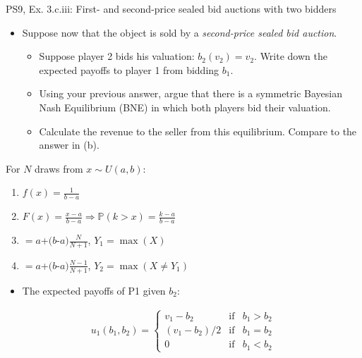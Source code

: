 \begin{frame}{PS9, Ex. 3.c.iii: First- and second-price sealed bid auctions with two bidders}
    \begin{multicols}{2}
      \begin{itemize}
        \item[(c)] Suppose now that the object is sold by a \textit{second-price sealed bid auction}.
        \begin{itemize}\normalsize
          \item[i.]   Suppose player 2 bids his valuation: $b_2(v_2) = v_2$. Write down the expected payoffs to player 1 from bidding $b_1$.
          \item[ii.]  Using your previous answer, argue that there is a symmetric Bayesian Nash Equilibrium (BNE) in which both players bid their valuation.
          \item[iii.] Calculate the revenue to the seller from this equilibrium. Compare to the answer in (b).
        \end{itemize}
      \end{itemize}
      For $N$ draws from $x\sim U(a, b):$
      \vspace{-6pt}
      \begin{enumerate}
        \item[PDF:] $f(x)=\frac{1}{b-a}$
        \item[CDF:] $F(x)=\frac{x-a}{b-a}\Rightarrow\mathbb{P}(k>x)=\frac{k-a}{b-a}$
        \item[$\mathbb{E}(Y_1)$] $=a$+$(b$-$a)\frac{N}{N+1}$, $Y_1=\max(X)$
        \item[$\mathbb{E}(Y_2)$] $=a$+$(b$-$a)\frac{N-1}{N+1}$, $Y_2=\max(X\neq Y_1)$
      \end{enumerate}
      \vfill\null\columnbreak
      \begin{itemize}
        \item[(i)] The expected payoffs of P1 given $b_2$:
      \end{itemize}
      \vspace{-16pt}
      \begin{align*}
        u_1(b_1,b_2)=\left\{\begin{array}{lcl}
          v_1-b_2     & \text{if} & b_1>b_2 \\
          (v_1-b_2)/2 & \text{if} & b_1=b_2 \\
          0           & \text{if} & b_1<b_2
        \end{array}\right.
      \end{align*}

\end{multicols}
\end{frame}
